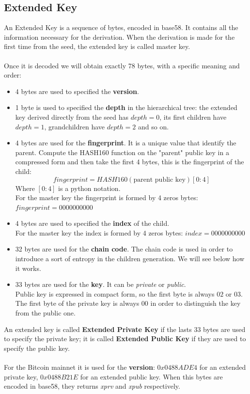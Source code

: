 \subsection{Extended Key}
An Extended Key is a sequence of bytes, encoded in base58. It contains all the information necessary for the derivation. When the derivation is made for the first time from the seed, the extended key is called master key.\\ \\
Once it is decoded we will obtain exactly 78 bytes, with a specific meaning and order:
\begin{itemize}[label=$\circledast$]
	\item 4 bytes are used to specified the \textbf{version}.
	\item 1 byte is used to specified the \textbf{depth} in the hierarchical tree: the extended key derived directly from the seed has $depth=0$, its first children have $depth=1$, grandchildren have $depth=2$ and so on.
	\item 4 bytes are used for the \textbf{fingerprint}. It is a unique value that identify the parent. Compute the HASH160 function on the "parent" public key in a compressed form and then take the first 4 bytes, this is the fingerprint of the child:
	\begin{equation*}
	fingerprint=HASH160(\text{parent public key})[0:4]
	\end{equation*}
	Where $[0:4]$ is a python notation.\\
	For the master key the fingerprint is formed by 4 zeros bytes: $fingerprint=0000000000$
	\item 4 bytes are used to specified the \textbf{index} of the child. \\
	For the master key the index is formed by 4 zeros bytes: $index=0000000000$
	\item 32 bytes are used for the \textbf{chain code}. The chain code is used in order to introduce a sort of entropy in the children generation. We will see below how it works.
	\item 33 bytes are used for the \textbf{key}. It can be \textit{private} or \textit{public}. \\ Public key is expressed in compact form, so the first byte is always $02$ or $03$. The first byte of the private key is always $00$ in order to distinguish the key from the public one.\\
\end{itemize}
An extended key is called \textbf{Extended Private Key} if the lasts 33 bytes are used to specify the private key; it is called \textbf{Extended Public Key} if they are used to specify the public key.
\\ \\
For the Bitcoin mainnet it is used for the \textbf{version}: $0x0488ADE4$ for an extended private key, $0x0488B21E$ for an extended public key. When this bytes are encoded in base58, they returns \textit{xprv} and \textit{xpub} respectively.

